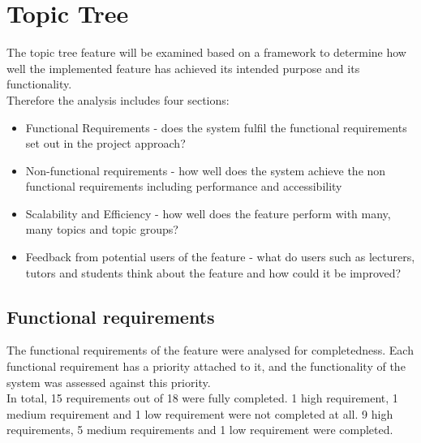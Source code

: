 \section{Topic Tree}

The topic tree feature will be examined based on a framework to determine how well the implemented feature has achieved its intended purpose and its functionality. \\

Therefore the analysis includes four sections:\\
\begin{itemize}
    \item Functional Requirements - does the system fulfil the functional requirements set out in the project approach?
    \item Non-functional requirements - how well does the system achieve the non functional requirements including performance and accessibility
    \item Scalability and Efficiency - how well does the feature perform with many, many topics and topic groups?
    \item Feedback from potential users of the feature - what do users such as lecturers, tutors and students think about the feature and how could it be improved?
\end{itemize}

\subsection{Functional requirements}
The functional requirements of the feature were analysed for completedness. Each functional requirement has a priority attached to it, and the functionality of the system was assessed against this priority. \\

In total, 15 requirements out of 18 were fully completed. 1 high requirement, 1 medium requirement and 1 low requirement were not completed at all. 9 high requirements, 5 medium requirements and 1 low requirement were completed. \\

